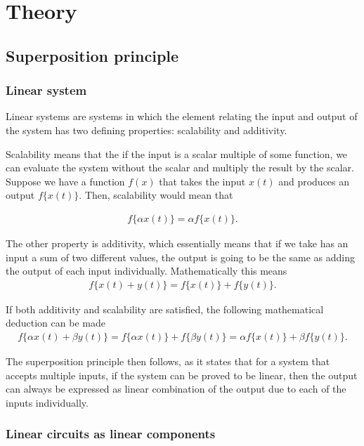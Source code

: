 \documentclass[english,12pt]{article}
\begin{document}
\section{Theory}
\subsection{Superposition principle}
\subsubsection{Linear system}

Linear systems are systems in which the element relating the input and output of the system has two defining properties: scalability and additivity.

Scalability means that the if the input is a scalar multiple of some function, we can evaluate the system without the scalar and multiply the result by the scalar. Suppose we have a function $f(x)$ that takes the input $x(t)$ and produces an output $f\{x(t)\}$. Then, scalability would mean that

\begin{align}
    f\{\alpha x(t)\} = \alpha f\{x(t)\}. \label{eq:1}
\end{align}

The other property is additivity, which essentially means that if we take has an input a sum of two different values, the output is going to be the same as adding the output of each input individually. Mathematically this means
\begin{align}
    f\{x(t) + y(t)\} = f\{x(t)\} + f\{y(t)\}. \label{eq:2}
\end{align}

If both additivity and scalability are satisfied, the following mathematical deduction can be made
\begin{align*}
    f\{\alpha x(t) + \beta y(t)\} = f\{\alpha x(t)\} + f\{\beta y(t)\} = \alpha f\{x(t)\} + \beta f\{y(t)\}.
\end{align*}

The superposition principle then follows, as it states that for a system that accepts multiple inputs, if the system can be proved to be linear, then the output can always be expressed as linear combination of the output due to each of the inputs individually.

\subsubsection{Linear circuits as linear components}
\end{document}
